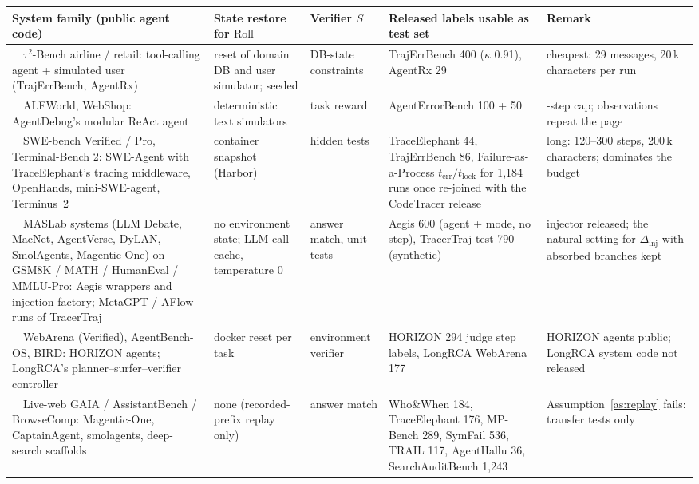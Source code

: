 \documentclass[10pt,a4paper]{article}
\begin{document}
\medskip\noindent\begin{minipage}{\linewidth}\centering\scriptsize
\setlength{\tabcolsep}{3pt}
\begin{tabularx}{\linewidth}{@{}>{\RaggedRight\hsize=1.15\hsize}X >{\RaggedRight\hsize=0.8\hsize}X >{\RaggedRight\hsize=0.65\hsize}X >{\RaggedRight\hsize=1.2\hsize}X >{\RaggedRight\hsize=1.2\hsize}X@{}}\toprule
System family (public agent code) & State restore for $\mathrm{Roll}$ & Verifier $S$ & Released labels usable as test set & Remark \\\midrule
1\ \ $\tau^2$-Bench airline / retail: tool-calling agent + simulated user (TrajErrBench, AgentRx) & reset of domain DB and user simulator; seeded & DB-state constraints & TrajErrBench 400 ($\kappa$ 0.91), AgentRx 29 & cheapest: 29 messages, 20\,k characters per run \\
2\ \ ALFWorld, WebShop: AgentDebug's modular ReAct agent & deterministic text simulators & task reward & AgentErrorBench 100 + 50 & 30-step cap; observations repeat the page \\
3\ \ SWE-bench Verified / Pro, Terminal-Bench 2: SWE-Agent with TraceElephant's tracing middleware, OpenHands, mini-SWE-agent, Terminus~2 & container snapshot (Harbor) & hidden tests & TraceElephant 44, TrajErrBench 86, Failure-as-a-Process $t_{\mathrm{err}}/t_{\mathrm{lock}}$ for 1,184 runs once re-joined with the CodeTracer release & long: 120--300 steps, 200\,k characters; dominates the budget \\
4\ \ MASLab systems (LLM Debate, MacNet, AgentVerse, DyLAN, SmolAgents, Magentic-One) on GSM8K / MATH / HumanEval / MMLU-Pro: Aegis wrappers and injection factory; MetaGPT / AFlow runs of TracerTraj & no environment state; LLM-call cache, temperature 0 & answer match, unit tests & Aegis 600 (agent + mode, no step), TracerTraj test 790 (synthetic) & injector released; the natural setting for $\Delta_{\mathrm{inj}}$ with absorbed branches kept \\
5\ \ WebArena (Verified), AgentBench-OS, BIRD: HORIZON agents; LongRCA's planner--surfer--verifier controller & docker reset per task & environment verifier & HORIZON 294 judge step labels, LongRCA WebArena 177 & HORIZON agents public; LongRCA system code not released \\
6\ \ Live-web GAIA / AssistantBench / BrowseComp: Magentic-One, CaptainAgent, smolagents, deep-search scaffolds & none (recorded-prefix replay only) & answer match & Who\&When 184, TraceElephant 176, MP-Bench 289, SymFail 536, TRAIL 117, AgentHallu 36, SearchAuditBench 1,243 & Assumption~\ref{as:replay} fails: transfer tests only \\\bottomrule
\end{tabularx}
\label{tab:engine}
\end{minipage}\medskip

\clearpage

\end{document}
